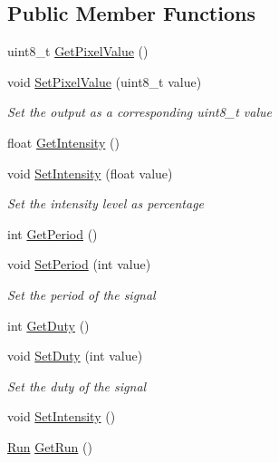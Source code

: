 \subsection*{Public Member Functions}
\begin{DoxyCompactItemize}
\item 
uint8\+\_\+t \hyperlink{class_hardware_1_1_p_w_m_a1eb3801b19831147129440bf35c29b7f}{Get\+Pixel\+Value} ()
\item 
void \hyperlink{class_hardware_1_1_p_w_m_ad9b2d460ab02f958653ff29b4cb62a80}{Set\+Pixel\+Value} (uint8\+\_\+t value)
\begin{DoxyCompactList}\small\item\em Set the output as a corresponding uint8\+\_\+t value \end{DoxyCompactList}\item 
float \hyperlink{class_hardware_1_1_p_w_m_a03b291fccd76436faf7d8efb415a4aa7}{Get\+Intensity} ()
\item 
void \hyperlink{class_hardware_1_1_p_w_m_ad6c6bb44a237454c86c1c28330f76afe}{Set\+Intensity} (float value)
\begin{DoxyCompactList}\small\item\em Set the intensity level as percentage \end{DoxyCompactList}\item 
int \hyperlink{class_hardware_1_1_p_w_m_a61652657a00420607e184d7cf2627202}{Get\+Period} ()
\item 
void \hyperlink{class_hardware_1_1_p_w_m_a205b979fa8b87d25b01ac8e8d0f06fb6}{Set\+Period} (int value)
\begin{DoxyCompactList}\small\item\em Set the period of the signal \end{DoxyCompactList}\item 
int \hyperlink{class_hardware_1_1_p_w_m_abc213166a3e5f725fe8eb810bdf63085}{Get\+Duty} ()
\item 
void \hyperlink{class_hardware_1_1_p_w_m_a93ea3627da17bf143ac548cbd623d13d}{Set\+Duty} (int value)
\begin{DoxyCompactList}\small\item\em Set the duty of the signal \end{DoxyCompactList}\item 
void \hyperlink{class_hardware_1_1_p_w_m_abf855c57004d264ec066fbd1a87fd5a8}{Set\+Intensity} ()
\item 
\hyperlink{class_hardware_1_1_p_w_m_a6f1e614731154a3613c03a4238ddd107}{Run} \hyperlink{class_hardware_1_1_p_w_m_a74be17798a57dfa1e394444f1ce11a64}{Get\+Run} ()

\end{DoxyCompactItemize}
